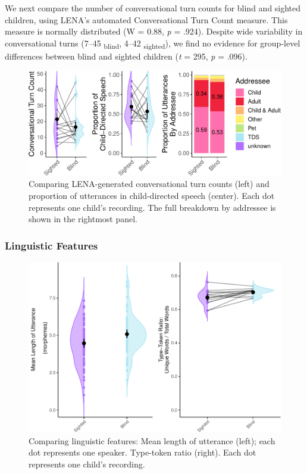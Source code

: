 \documentclass[
  man,floatsintext]{apa6}
\begin{document}
We next compare the number of conversational turn counts for blind and sighted children, using LENA's automated Conversational Turn Count measure. This measure is normally distributed (W = 0.88, \emph{p} = .924). Despite wide variability in conversational turns (7--45 \textsubscript{blind}, 4--42 \textsubscript{sighted}), we find no evidence for group-level differences between blind and sighted children (\emph{t} = 295, \emph{p} = .096).

\begin{figure}
\centering
\includegraphics{input_quality_manuscript_files/figure-latex/interactivity-plots-1.pdf}
\caption{\label{fig:interactivity-plots}Comparing LENA-generated conversational turn counts (left) and proportion of utterances in child-directed speech (center). Each dot represents one child's recording. The full breakdown by addressee is shown in the rightmost panel.}
\end{figure}

\hypertarget{linguistic-features-1}{%
\subsubsection{Linguistic Features}\label{linguistic-features-1}}

\begin{figure}
\centering
\includegraphics{input_quality_manuscript_files/figure-latex/linguistic-plots-1.pdf}
\caption{\label{fig:linguistic-plots}Comparing linguistic features: Mean length of utterance (left); each dot represents one speaker. Type-token ratio (right). Each dot represents one child's recording.}
\end{figure}
\end{document}
